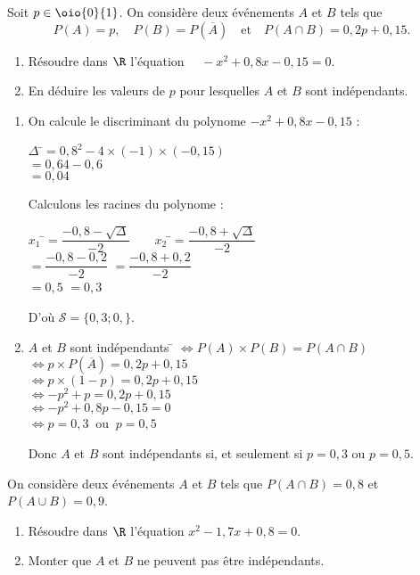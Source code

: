 \documentclass[a4paper,11pt,exos]{nsi} %
\begin{document}
\exo{}
\textcolor{UGLiBlue}{Soit $p\in\oio{0}{1}$. On considère deux événements $A$ et $B$ tels que $$P(A)=p,\quad P(B)=P(\overline{A})\quad \text{et}\quad P(A\cap B)=0,2p+0,15.$$
\begin{enumerate}
    \item Résoudre dans $\R$ l'équation $\quad -x^2+0,8x-0,15=0$.
    \item En déduire les valeurs de $p$ pour lesquelles $A$ et $B$ sont indépendants.
\end{enumerate}}

\begin{enumerate}
    \item On calcule le discriminant du polynome $-x^2+0,8x-0,15$ :
    \begin{tabbing}
        $\Delta$ \=$=0,8^2-4\times (-1)\times (-0,15)$\\
                \>$=0,64-0,6$\\
                \>$=0,04$
    \end{tabbing}
    Calculons les racines du polynome :
    \begin{tabbing}
        $x_1$ \=$=\dfrac{-0,8-\sqrt{\Delta}}{-2} \qquad x_2$ \=$=\dfrac{-0,8+\sqrt{\Delta}}{-2}$\\[.5em]
                \>$=\dfrac{-0,8-0,2}{-2}$ \>$=\dfrac{-0,8+0,2}{-2}$\\[.5em]
                \>$=0,5$   \>$=0,3$            
    \end{tabbing}
    D'où $\mathcal{S}=\{0,3;0,\}$.
    \item \begin{tabbing}
        $A$ et $B$ sont indépendants \= $\iff P(A)\times P(B)=P(A\cap B)$\\
                                    \> $\iff p\times P(\overline{A})=0,2p+0,15$\\
                                    \> $\iff p\times (1-p)=0,2p+0,15$\\
                                    \> $\iff -p^2+p=0,2p+0,15$\\
                                    \> $\iff -p^2+0,8p-0,15=0$\\
                                    \> $\iff p= 0,3 \ $ ou $\ p=0,5$
    \end{tabbing}
    Donc $A$ et $B$ sont indépendants si, et seulement si $p=0,3$ ou $p=0,5$.
\end{enumerate}


\exo{ \faStar\faStar}
\textcolor{UGLiBlue}{On considère deux événements $A$ et $B$ tels que $P(A\cap B)=0,8$ et $P(A\cup B)=0,9$.
\begin{enumerate}
    \item Résoudre dans $\R$ l'équation $x^2-1,7x+0,8=0$.
    \item Monter que $A$ et $B$ ne peuvent pas être indépendants.
\end{enumerate}}
\end{document}
